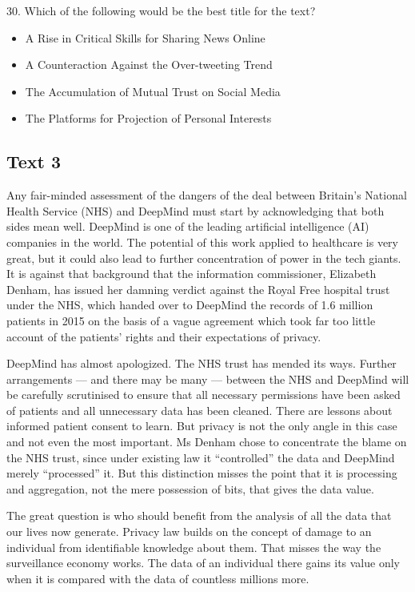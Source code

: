 \documentclass[UTF8,11pt]{ctexart}
\begin{document}
30. Which of the following would be the best title for the text?


\begin{itemize}[leftmargin=2em,itemsep=.2em,topsep=.4em]\item[A.] A Rise in Critical Skills for Sharing News Online
\item[B.] A Counteraction Against the Over-tweeting Trend
\item[C.] The Accumulation of Mutual Trust on Social Media
\item[D.] The Platforms for Projection of Personal Interests
\end{itemize}

\subsection*{\textbf{Text 3}}


Any fair-minded assessment of the dangers of the deal between Britain’s National Health Service (NHS) and DeepMind must start by acknowledging that both sides mean well. DeepMind is one of the leading artificial intelligence (AI) companies in the world. The potential of this work applied to healthcare is very great, but it could also lead to further concentration of power in the tech giants. It is against that background that the information commissioner, Elizabeth Denham, has issued her damning verdict against the Royal Free hospital trust under the NHS, which handed over to DeepMind the records of 1.6 million patients in 2015 on the basis of a vague agreement which took far too little account of the patients’ rights and their expectations of privacy.


DeepMind has almost apologized. The NHS trust has mended its ways. Further arrangements — and there may be many — between the NHS and DeepMind will be carefully scrutinised to ensure that all necessary permissions have been asked of patients and all unnecessary data has been cleaned. There are lessons about informed patient consent to learn. But privacy is not the only angle in this case and not even the most important. Ms Denham chose to concentrate the blame on the NHS trust, since under existing law it “controlled” the data and DeepMind merely “processed” it. But this distinction misses the point that it is processing and aggregation, not the mere possession of bits, that gives the data value.


The great question is who should benefit from the analysis of all the data that our lives now generate. Privacy law builds on the concept of damage to an individual from identifiable knowledge about them. That misses the way the surveillance economy works. The data of an individual there gains its value only when it is compared with the data of countless millions more.
\end{document}
